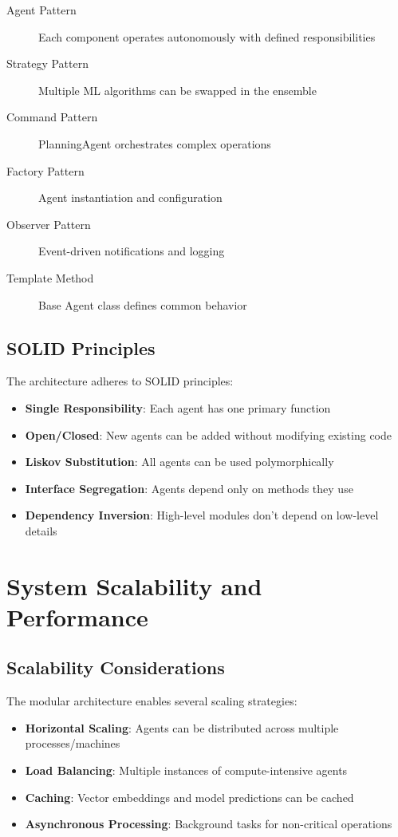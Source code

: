 \begin{description}
\item[Agent Pattern] Each component operates autonomously with defined responsibilities
\item[Strategy Pattern] Multiple ML algorithms can be swapped in the ensemble
\item[Command Pattern] PlanningAgent orchestrates complex operations
\item[Factory Pattern] Agent instantiation and configuration
\item[Observer Pattern] Event-driven notifications and logging
\item[Template Method] Base Agent class defines common behavior
\end{description}

\subsection{SOLID Principles}

The architecture adheres to SOLID principles:

\begin{itemize}
\item \textbf{Single Responsibility}: Each agent has one primary function
\item \textbf{Open/Closed}: New agents can be added without modifying existing code
\item \textbf{Liskov Substitution}: All agents can be used polymorphically
\item \textbf{Interface Segregation}: Agents depend only on methods they use
\item \textbf{Dependency Inversion}: High-level modules don't depend on low-level details
\end{itemize}

\section{System Scalability and Performance}

\subsection{Scalability Considerations}

The modular architecture enables several scaling strategies:

\begin{itemize}
\item \textbf{Horizontal Scaling}: Agents can be distributed across multiple processes/machines
\item \textbf{Load Balancing}: Multiple instances of compute-intensive agents
\item \textbf{Caching}: Vector embeddings and model predictions can be cached
\item \textbf{Asynchronous Processing}: Background tasks for non-critical operations
\end{itemize}

